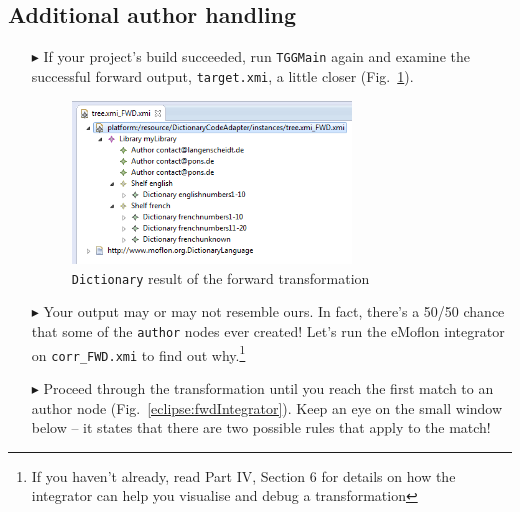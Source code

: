 \newpage
\hypertarget{t2m close}{}
\subsection{Additional author handling}
\genHeader

\begin{itemize}

\item[$\blacktriangleright$] If your project's build succeeded, run \texttt{TGGMain} again and examine the successful forward output, 
\texttt{target.xmi}, a little closer (Fig.~\ref{eclipse:generatedFwdTrsfm}).

\vspace{0.5cm}

\begin{figure}[htbp]
\begin{center}
  \includegraphics[width=0.7\textwidth]{eclipse_generatedForwardTransformation}
  \caption{\texttt{Dictionary} result of the forward transformation}
  \label{eclipse:generatedFwdTrsfm}
\end{center}
\end{figure}

\vspace{0.5cm}

\item[$\blacktriangleright$] Your output may or may not resemble ours. In fact, there's a 50/50 chance that some of the \texttt{author} nodes ever created!
Let's run the eMoflon integrator on \texttt{corr\_FWD.xmi} to find out why.\footnote{If you haven't already, read Part IV, Section 6 for details on how the
integrator can help you visualise and debug a transformation}

\vspace{0.5cm}

\item[$\blacktriangleright$] Proceed through the transformation until you reach the first match to an author node (Fig.~\ref{eclipse:fwdIntegrator}). Keep an
eye on the small window below -- it states that there are two possible rules that apply to the match!


\end{itemize}
